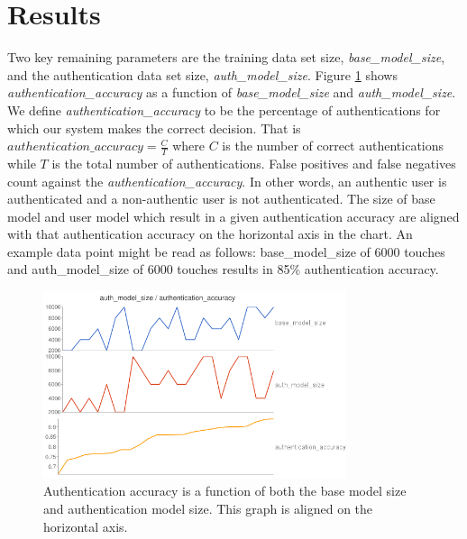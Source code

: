 \documentclass{acm_proc_article-sp}
\begin{document}
%
%
\section{Results}
\label{sec:results}

Two key remaining parameters are 
the training data set size, {\it base\_model\_size}, and the 
authentication data set size, {\it auth\_model\_size}.
Figure \ref{fig:authentication_accuracy} shows {\it authentication\_accuracy} 
as a function of {\it base\_model\_size} and {\it auth\_model\_size}.
We define {\it authentication\_accuracy} to be the percentage of authentications for which our system makes the correct decision.
That is $authentication\_accuracy = \frac{C}{T}$ where
$C$ is the number of correct authentications while
$T$ is the total number of authentications.
False positives and false negatives count against the {\it authentication\_accuracy}.
In other words, an authentic user is authenticated and a non-authentic user is not authenticated.
The size of base model and user model which result in a given authentication accuracy are aligned with that authentication accuracy on the horizontal axis in the chart.
An example data point
might be read as follows: 
base\_model\_size of
6000 touches and auth\_model\_size of 6000 touches
results in 85\% authentication accuracy.

\begin{figure}
\centering
\includegraphics[width=3.5in]{authentication_accuracy_vs_model_size.png}
\caption{Authentication accuracy is a function of
both the base model size and authentication model size.
This graph is aligned on the horizontal axis.}
\label{fig:authentication_accuracy}
\end{figure}
\end{document}

